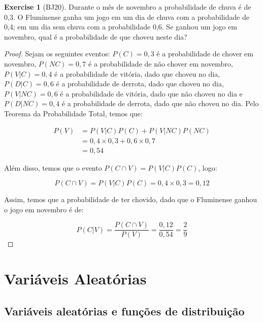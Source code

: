 \documentclass[
]{article}
\theoremstyle{definition}
\theoremstyle{definition}
\theoremstyle{definition}
\newtheorem{exercise}{Exercise}[section]
\theoremstyle{definition}
\theoremstyle{remark}
\begin{document}
\begin{exercise}[BJ20]

Durante o mês de novembro a probabilidade de chuva é de 0,3. O Fluminense ganha um jogo em um dia de chuva com a probabilidade de 0,4; em um dia sem chuva com a probabilidade 0,6. Se ganhou um jogo em novembro, qual é a probabilidade de que choveu neste dia?

\begin{proof}
Sejam os seguintes eventos: \(P(C) = 0,3\) é a probabilidade de chover em novembro, \(P(NC) = 0,7\) é a probabilidade de não chover em novembro, \(P(V|C) = 0,4\) é a probabilidade de vitória, dado que choveu no dia, \(P(D|C) = 0,6\) é a probabilidade de derrota, dado que choveu no dia, \(P(V|NC) = 0,6\) é a probabilidade de vitória, dado que não choveu no dia e \(P(D|NC) = 0,4\) é a probabilidade de derrota, dado que não choveu no dia. Pelo Teorema da Probabilidade Total, temos que:

\begin{align*}
P(V) &= P(V|C)P(C) + P(V|NC)P(NC) \\
&= 0,4 \times 0,3 + 0,6 \times 0,7 \\
&= 0,54
\end{align*}

Além disso, temos que o evento \(P(C \cap V) = P(V|C)P(C)\), logo:

\begin{equation*}
P(C \cap V) = P(V|C)P(C) = 0,4 \times 0,3 = 0,12
\end{equation*}

Assim, temos que a probabilidade de ter chovido, dado que o Fluminense ganhou o jogo em novembro é de:

\begin{equation*}
P(C|V) = \frac{P(C \cap V)}{P(V)} = \frac{0,12}{0,54} = \frac{2}{9}
\end{equation*}
\end{proof}

\end{exercise}

\newpage

\hypertarget{variuxe1veis-aleatuxf3rias}{%
\section{Variáveis Aleatórias}\label{variuxe1veis-aleatuxf3rias}}

\hypertarget{variuxe1veis-aleatuxf3rias-e-funuxe7uxf5es-de-distribuiuxe7uxe3o}{%
\subsection{Variáveis aleatórias e funções de distribuição}\label{variuxe1veis-aleatuxf3rias-e-funuxe7uxf5es-de-distribuiuxe7uxe3o}}
\end{document}
